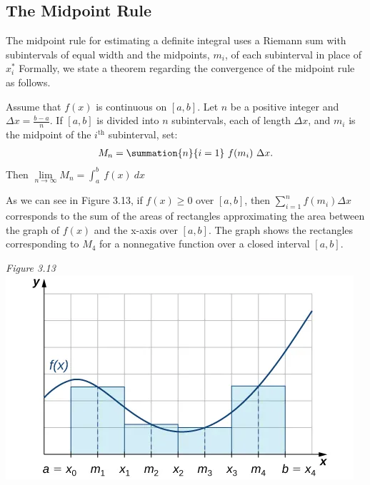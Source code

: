 \documentclass{report}
\begin{document}
    \subsection*{The Midpoint Rule}
    \bigbreak \noindent 
    The midpoint rule for estimating a definite integral uses a Riemann sum with subintervals of equal width and the midpoints, $m_{i}$,
     of each subinterval in place of $x_{i}^{*}$
     Formally, we state a theorem regarding the convergence of the midpoint rule as follows.
     \bigbreak \noindent 
     \begin{thrm}
        Assume that $f(x)$ is continuous on $[a,b]$. Let $n$ be a positive integer and $\Delta x = \frac{b-a}{n}$. If $[a,b]$ is divided into $n$ subintervals, each of length $\Delta x$, and $m_i$ is the midpoint of the $i^{\text{th}}$ subinterval, set:
        \begin{align*}
            M_{n} = \summation{n}{i=1}\ f(m_{i})\  \Delta x
        .\end{align*}
        \bigbreak \noindent 
        Then $\lim\limits_{n \to \infty}{M_{n}} = \int_{a}^{b}\ f(x)\ dx$  
 

     \end{thrm}
     \bigbreak \noindent 
     \begin{minipage}[]{0.47\textwidth}
        As we can see in Figure 3.13, if $f(x) \geq 0$ 
        over $[a,b]$,
        then $\sum_{i=1}^{n} f(m_i) \Delta x$
        corresponds to the sum of the areas of rectangles approximating the area between the graph of $f(x)$
        and the x-axis over $[a,b]$.
        The graph shows the rectangles corresponding to $M_4$
        for a nonnegative function over a closed interval $[a,b]$.
     \end{minipage}
     \begin{minipage}[]{0.47\textwidth}
    \begin{center}
        \textit{Figure 3.13}
        \bigbreak \noindent 
        \includegraphics[scale=0.5]{figures/pic1.png }
    \end{center}     
     \end{minipage}
\end{document}

